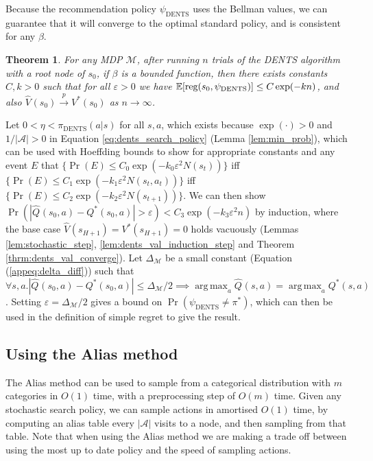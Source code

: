 \documentclass{article}
\newcommand{\bb}[1]{\mathbb{#1}}
\newcommand{\cl}[1]{\mathcal{#1}}
\newcommand{\Vt}[2]{\hat{V}^{#2}(#1)}
\newcommand{\Qt}[3]{\hat{Q}^{#3}(#1,#2)}
\newcommand{\reg}{\textnormal{reg}}
\DeclareMathOperator*{\argmax}{arg\,max}
\newcommand{\rap}{\overset{p}{\to}}
\theoremstyle{plain}
\newtheorem{theorem}{Theorem}[section]
\newenvironment{proofoutline}{\proof[Proof outline]}{\endproof}
\begin{document}
        Because the recommendation policy $\psi_{\text{DENTS}}$ uses the 
        Bellman
        values, we can guarantee that it will converge to the optimal standard policy, and is consistent for any $\beta$.
        \begin{theorem} \label{thrm:dents}
            For any MDP $\cl{M}$, after running $n$ trials of the DENTS algorithm with a root node of $s_0$, if $\beta$ is a bounded function, then there exists constants $C,k>0$ such that for all $\varepsilon>0$ we have 
            $\bb{E}[\reg(s_0,\psi_{\textnormal{DENTS}})] \leq C\exp(-kn)$, and also $\Vt{s_0}{} \rap V^*(s_0)$ as $n\rightarrow\infty$.
        \end{theorem}
        \begin{proofoutline}
        		Let $0 < \eta < \pi_{\text{DENTS}}(a|s)$ for all $s,a$, which exists because $\exp(\cdot)>0$ and $1 / |\cl{A}| > 0$ in Equation \ref{eq:dents_search_policy} (Lemma \ref{lem:min_prob}),
        		which can be used with Hoeffding bounds to show for appropriate constants and any event $E$ that $\{\Pr(E)\leq C_0\exp(-k_0\varepsilon^2N(s_t))\}$ iff $\{\Pr(E)\leq C_1\exp(-k_1\varepsilon^2N(s_t,a_t))\}$ iff $\{\Pr(E)\leq C_2\exp(-k_2\varepsilon^2N(s_{t+1}))\}$.
			We can then show $\Pr(|\Qt{s_0}{a}{}-Q^*(s_0,a)|>\varepsilon) < C_3\exp\left(-k_3\varepsilon^2n\right)$ by induction, where the base case $\Vt{s_{H+1}}{}=V^*(s_{H+1})=0$ holds vacuously (Lemmas \ref{lem:stochastic_step}, \ref{lem:dents_val_induction_step} and Theorem \ref{thrm:dents_val_converge}).
			Let $\Delta_{\cl{M}}$ be a small constant (Equation (\ref{appeq:delta_diff})) such that $\forall s,a. | \Qt{s_0}{a}{}-Q^*(s_0,a) | \leq \Delta_{\cl{M}} / 2 \implies \argmax_a \Qt{s}{a}{} = \argmax_a Q^*(s,a)$. 
			Setting $\varepsilon = \Delta_{\cl{M}}/2$ gives a bound on $\Pr(\psi_{\text{DENTS}}\neq\pi^*)$, which can then be used in the definition of simple regret to give the result.
        \end{proofoutline}
        
        
        
    \subsection{Using the Alias method} \label{sec:alias}
    		The Alias method \cite{alias1,alias2} can be used to sample from a categorical distribution with $m$ categories in $O(1)$ time, with a preprocessing step of $O(m)$ time. Given any stochastic search policy, we can sample actions in amortised $O(1)$ time, by computing an alias table every $|\cl{A}|$ visits to a node, and then sampling from that table. Note that when using the Alias method we are making a trade off between using the most up to date policy and the speed of sampling actions.
    		
\end{document}
